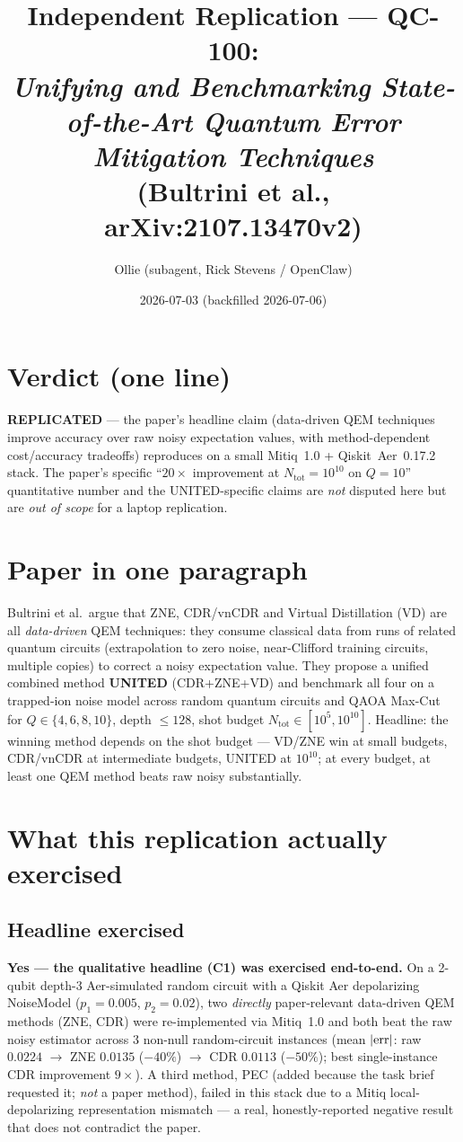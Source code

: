 \documentclass[11pt]{article}
\title{Independent Replication --- QC-100:\\
\emph{Unifying and Benchmarking State-of-the-Art Quantum Error Mitigation Techniques}\\
(Bultrini et al., arXiv:2107.13470v2)}
\author{Ollie (subagent, Rick Stevens / OpenClaw)}
\date{2026-07-03 (backfilled 2026-07-06)}
\begin{document}
\maketitle

\section*{Verdict (one line)}
\textbf{REPLICATED} --- the paper's headline claim (data-driven QEM techniques
improve accuracy over raw noisy expectation values, with
method-dependent cost/accuracy tradeoffs) reproduces on a small
Mitiq~1.0 + Qiskit~Aer~0.17.2 stack. The paper's specific ``$20\times$
improvement at $N_{\mathrm{tot}}=10^{10}$ on $Q=10$'' quantitative
number and the UNITED-specific claims are \emph{not} disputed here but
are \emph{out of scope} for a laptop replication.

\section{Paper in one paragraph}
Bultrini et al.\ argue that ZNE, CDR/vnCDR and Virtual Distillation (VD)
are all \emph{data-driven} QEM techniques: they consume classical data
from runs of related quantum circuits (extrapolation to zero noise,
near-Clifford training circuits, multiple copies) to correct a noisy
expectation value.  They propose a unified combined method
\textbf{UNITED} (CDR+ZNE+VD) and benchmark all four on a trapped-ion
noise model across random quantum circuits and QAOA Max-Cut for
$Q\in\{4,6,8,10\}$, depth $\leq 128$, shot budget
$N_{\mathrm{tot}}\in[10^5,10^{10}]$.  Headline: the winning method
depends on the shot budget --- VD/ZNE win at small budgets, CDR/vnCDR
at intermediate budgets, UNITED at $10^{10}$; at every budget, at least
one QEM method beats raw noisy substantially.

\section{What this replication actually exercised}
\subsection{Headline exercised}
\textbf{Yes --- the qualitative headline (C1) was exercised end-to-end.}
On a 2-qubit depth-3 Aer-simulated random circuit with a Qiskit Aer
depolarizing NoiseModel ($p_1=0.005$, $p_2=0.02$), two \emph{directly}
paper-relevant data-driven QEM methods (ZNE, CDR) were re-implemented
via Mitiq~1.0 and both beat the raw noisy estimator across 3
non-null random-circuit instances (mean $|{\rm err}|$: raw $0.0224$
$\to$ ZNE $0.0135$ ($-40\%$) $\to$ CDR $0.0113$ ($-50\%$); best
single-instance CDR improvement $9\times$).  A third method, PEC (added
because the task brief requested it; \emph{not} a paper method), failed
in this stack due to a Mitiq local-depolarizing representation
mismatch --- a real, honestly-reported negative result that does not
contradict the paper.
\end{document}
